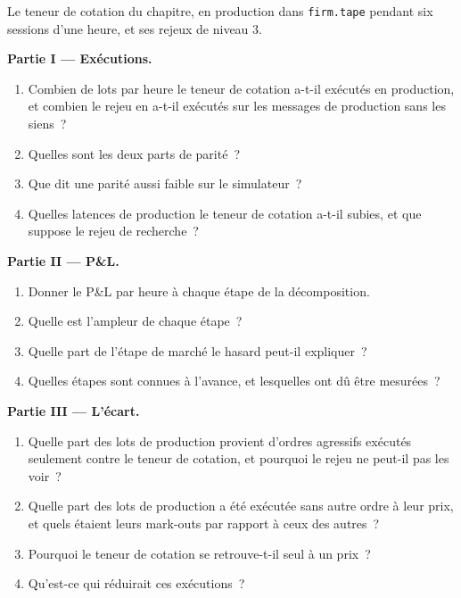 \begin{problem}\label{pb:rs:simulation-versus-live:1}
Le teneur de cotation du chapitre, en production dans \texttt{firm.tape} pendant six sessions d'une heure, et ses rejeux de niveau 3.

\medskip\noindent\textbf{Partie I --- Exécutions.}
\begin{enumerate}
\item Combien de lots par heure le teneur de cotation a-t-il exécutés en production, et combien le rejeu en a-t-il exécutés sur les messages de production sans les siens~?
\item Quelles sont les deux parts de parité~?
\item Que dit une parité aussi faible sur le simulateur~?
\item Quelles latences de production le teneur de cotation a-t-il subies, et que suppose le rejeu de recherche~?
\end{enumerate}

\medskip\noindent\textbf{Partie II --- P\&L.}
\begin{enumerate}[resume]
\item Donner le P\&L par heure à chaque étape de la décomposition.
\item Quelle est l'ampleur de chaque étape~?
\item Quelle part de l'étape de marché le hasard peut-il expliquer~?
\item Quelles étapes sont connues à l'avance, et lesquelles ont dû être mesurées~?
\end{enumerate}

\medskip\noindent\textbf{Partie III --- L'écart.}
\begin{enumerate}[resume]
\item Quelle part des lots de production provient d'ordres agressifs exécutés seulement contre le teneur de cotation, et pourquoi le rejeu ne peut-il pas les voir~?
\item Quelle part des lots de production a été exécutée sans autre ordre à leur prix, et quels étaient leurs mark-outs par rapport à ceux des autres~?
\item Pourquoi le teneur de cotation se retrouve-t-il seul à un prix~?
\item Qu'est-ce qui réduirait ces exécutions~?
\end{enumerate}


\end{problem}
